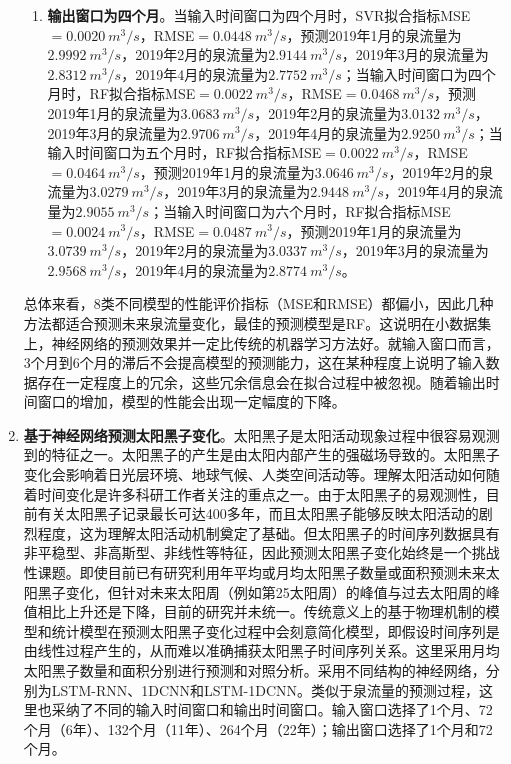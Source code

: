 \begin{enumerate}
\begin{enumerate}
      \item \textbf{输出窗口为四个月}。当输入时间窗口为四个月时，SVR拟合指标MSE$=\SI{0.0020}{m^{3}/s}$，RMSE$=\SI{0.0448}{m^{3}/s}$，预测2019年1月的泉流量为$\SI{2.9992}{m^{3}/s}$，2019年2月的泉流量为$\SI{2.9144}{m^{3}/s}$，2019年3月的泉流量为$\SI{2.8312}{m^{3}/s}$，2019年4月的泉流量为$\SI{2.7752}{m^{3}/s}$；当输入时间窗口为四个月时，RF拟合指标MSE$=\SI{0.0022}{m^{3}/s}$，RMSE$=\SI{0.0468}{m^{3}/s}$，预测2019年1月的泉流量为$\SI{3.0683}{m^{3}/s}$，2019年2月的泉流量为$\SI{3.0132}{m^{3}/s}$，2019年3月的泉流量为$\SI{2.9706}{m^{3}/s}$，2019年4月的泉流量为$\SI{2.9250}{m^{3}/s}$；当输入时间窗口为五个月时，RF拟合指标MSE$=\SI{0.0022}{m^{3}/s}$，RMSE$=\SI{0.0464}{m^{3}/s}$，预测2019年1月的泉流量为$\SI{3.0646}{m^{3}/s}$，2019年2月的泉流量为$\SI{3.0279}{m^{3}/s}$，2019年3月的泉流量为$\SI{2.9448}{m^{3}/s}$，2019年4月的泉流量为$\SI{2.9055}{m^{3}/s}$；当输入时间窗口为六个月时，RF拟合指标MSE$=\SI{0.0024}{m^{3}/s}$，RMSE$=\SI{0.0487}{m^{3}/s}$，预测2019年1月的泉流量为$\SI{3.0739}{m^{3}/s}$，2019年2月的泉流量为$\SI{3.0337}{m^{3}/s}$，2019年3月的泉流量为$\SI{2.9568}{m^{3}/s}$，2019年4月的泉流量为$\SI{2.8774}{m^{3}/s}$。
    \end{enumerate}
  
    总体来看，8类不同模型的性能评价指标（MSE和RMSE）都偏小，因此几种方法都适合预测未来泉流量变化，最佳的预测模型是RF。这说明在小数据集上，神经网络的预测效果并一定比传统的机器学习方法好。就输入窗口而言，3个月到6个月的滞后不会提高模型的预测能力，这在某种程度上说明了输入数据存在一定程度上的冗余，这些冗余信息会在拟合过程中被忽视。随着输出时间窗口的增加，模型的性能会出现一定幅度的下降。
  
  
    \item \textbf{基于神经网络预测太阳黑子变化}。太阳黑子是太阳活动现象过程中很容易观测到的特征之一。太阳黑子的产生是由太阳内部产生的强磁场导致的。太阳黑子变化会影响着日光层环境、地球气候、人类空间活动等。理解太阳活动如何随着时间变化是许多科研工作者关注的重点之一。由于太阳黑子的易观测性，目前有关太阳黑子记录最长可达400多年，而且太阳黑子能够反映太阳活动的剧烈程度，这为理解太阳活动机制奠定了基础。但太阳黑子的时间序列数据具有非平稳型、非高斯型、非线性等特征，因此预测太阳黑子变化始终是一个挑战性课题。即使目前已有研究利用年平均或月均太阳黑子数量或面积预测未来太阳黑子变化，但针对未来太阳周（例如第25太阳周）的峰值与过去太阳周的峰值相比上升还是下降，目前的研究并未统一。传统意义上的基于物理机制的模型和统计模型在预测太阳黑子变化过程中会刻意简化模型，即假设时间序列是由线性过程产生的，从而难以准确捕获太阳黑子时间序列关系。这里采用月均太阳黑子数量和面积分别进行预测和对照分析。采用不同结构的神经网络，分别为LSTM-RNN、1DCNN和LSTM-1DCNN。类似于泉流量的预测过程，这里也采纳了不同的输入时间窗口和输出时间窗口。输入窗口选择了1个月、72个月（6年）、132个月（11年）、264个月（22年）；输出窗口选择了1个月和72个月。
    

\end{enumerate}

